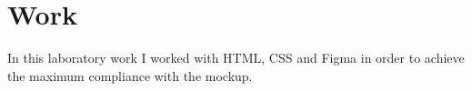 \chapter{Work}

In this laboratory work I worked with HTML, CSS and Figma in order to achieve the maximum compliance with the mockup.


